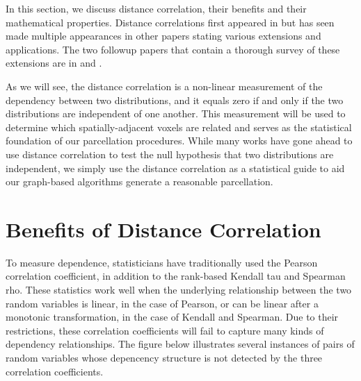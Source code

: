 
In this section, we discuss distance correlation, their benefits
and their mathematical properties. Distance correlations first appeared
in  \cite{szekely2007measuring} but has seen made multiple appearances
in other papers stating various extensions and applications. The two
followup papers that contain a thorough survey of these extensions are
in \cite{szekely2013energy} and \cite{sejdinovic2013equivalence}.

As we will see, the distance correlation is a non-linear measurement of
the dependency between two distributions, and it equals zero if and only
if the two distributions are independent of one another. This
measurement will be used to determine which spatially-adjacent voxels
are related and serves as the statistical foundation of our parcellation
procedures. While many works have gone ahead to use distance correlation
to test the null hypothesis that two distributions are independent, we
simply use the distance correlation as a statistical guide to aid our
graph-based algorithms generate a reasonable parcellation.

\section{Benefits of Distance Correlation}

To measure dependence, statisticians have traditionally used the Pearson
correlation coefficient, in addition to the rank-based Kendall tau and
Spearman rho. These statistics work well when the underlying
relationship between the two random variables is linear, in the case of
Pearson, or can be linear after a monotonic transformation, in the case
of Kendall and Spearman. Due to their restrictions, these correlation
coefficients will fail to capture many kinds of dependency
relationships. The figure below illustrates several instances of pairs
of random variables whose depencency structure is not detected by the
three correlation coefficients.

